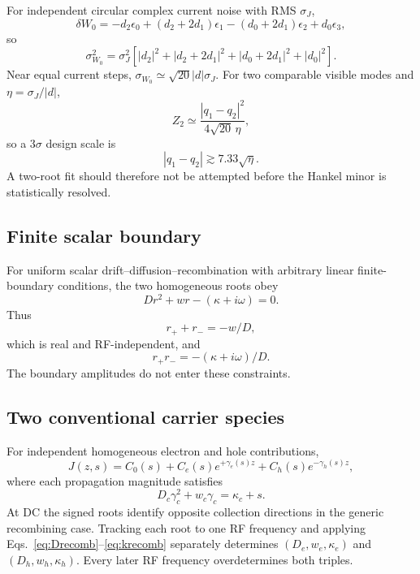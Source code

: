 \documentclass[11pt]{article}
\begin{document}
For independent circular complex current noise with RMS $\sigma_J$,
\begin{equation}
\delta W_0
=-d_2\epsilon_0+(d_2+2d_1)\epsilon_1
-(d_0+2d_1)\epsilon_2+d_0\epsilon_3,
\end{equation}
so
\begin{equation}
\boxed{
\sigma_{W_0}^2=\sigma_J^2\left[
|d_2|^2+|d_2+2d_1|^2+|d_0+2d_1|^2+|d_0|^2
\right].}
\label{eq:Wnoise}
\end{equation}
Near equal current steps, $\sigma_{W_0}\simeq\sqrt{20}|d|\sigma_J$. For two comparable visible modes and $\eta=\sigma_J/|d|$,
\begin{equation}
Z_2\simeq\frac{|q_1-q_2|^2}{4\sqrt{20}\,\eta},
\end{equation}
so a $3\sigma$ design scale is
\begin{equation}
\boxed{|q_1-q_2|\gtrsim7.33\sqrt{\eta}.}
\label{eq:twores}
\end{equation}
A two-root fit should therefore not be attempted before the Hankel minor is statistically resolved.

\subsection{Finite scalar boundary}

For uniform scalar drift--diffusion--recombination with arbitrary linear finite-boundary conditions, the two homogeneous roots obey
\begin{equation}
D r^2+w r-(\kappa+i\omega)=0.
\end{equation}
Thus
\begin{equation}
\boxed{r_++r_-=-w/D,}
\label{eq:rootsum}
\end{equation}
which is real and RF-independent, and
\begin{equation}
\boxed{r_+r_-=-(\kappa+i\omega)/D.}
\label{eq:rootprod}
\end{equation}
The boundary amplitudes do not enter these constraints.

\subsection{Two conventional carrier species}

For independent homogeneous electron and hole contributions,
\begin{equation}
J(z,s)=C_0(s)+C_e(s)e^{+\gamma_e(s)z}+C_h(s)e^{-\gamma_h(s)z},
\end{equation}
where each propagation magnitude satisfies
\begin{equation}
D_c\gamma_c^2+w_c\gamma_c=\kappa_c+s.
\end{equation}
At DC the signed roots identify opposite collection directions in the generic recombining case. Tracking each root to one RF frequency and applying Eqs.~\eqref{eq:Drecomb}--\eqref{eq:krecomb} separately determines $(D_e,w_e,\kappa_e)$ and $(D_h,w_h,\kappa_h)$. Every later RF frequency overdetermines both triples.
\end{document}
